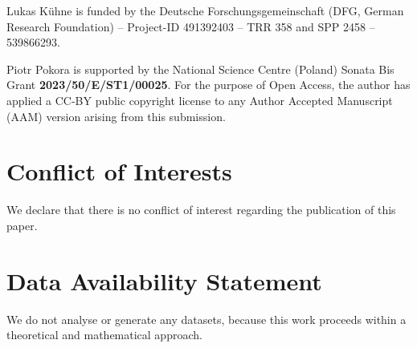 \documentclass[12pt]{amsart}
\theoremstyle{plain}
\theoremstyle{definition}
\numberwithin{equation}{section}
\begin{document}
Lukas K\"uhne is funded by the Deutsche Forschungsgemeinschaft (DFG, German Research Foundation) – Project-ID 491392403 – TRR 358 and SPP 2458 -- 539866293.

Piotr Pokora is supported by the National Science Centre (Poland) Sonata Bis Grant \textbf{2023/50/E/ST1/00025}. For the purpose of Open Access, the author has applied a CC-BY public copyright license to any Author Accepted Manuscript (AAM) version arising from this submission.

\section*{Conflict of Interests}
We declare that there is no conflict of interest regarding the publication of this paper.
\section*{Data Availability Statement}
We do not analyse or generate any datasets, because this work proceeds within a theoretical and mathematical approach. 
\end{document}
